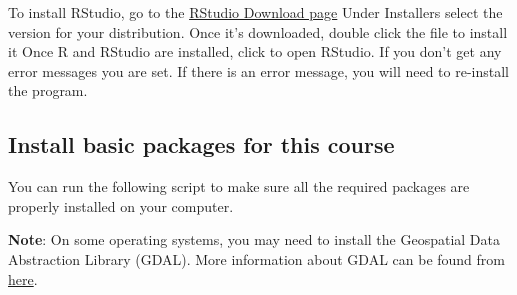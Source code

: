 \documentclass[]{book}
\newenvironment{Shaded}{\begin{snugshade}}{\end{snugshade}}
\newcommand{\CommentTok}[1]{\textcolor[rgb]{0.56,0.35,0.01}{\textit{#1}}}
\newcommand{\ControlFlowTok}[1]{\textcolor[rgb]{0.13,0.29,0.53}{\textbf{#1}}}
\newcommand{\DataTypeTok}[1]{\textcolor[rgb]{0.13,0.29,0.53}{#1}}
\newcommand{\KeywordTok}[1]{\textcolor[rgb]{0.13,0.29,0.53}{\textbf{#1}}}
\newcommand{\NormalTok}[1]{#1}
\newcommand{\OperatorTok}[1]{\textcolor[rgb]{0.81,0.36,0.00}{\textbf{#1}}}
\newcommand{\StringTok}[1]{\textcolor[rgb]{0.31,0.60,0.02}{#1}}
\begin{document}
To install RStudio, go to the \href{https://www.rstudio.com/products/rstudio/download/\#download}{RStudio Download page}
Under Installers select the version for your distribution.
Once it's downloaded, double click the file to install it
Once R and RStudio are installed, click to open RStudio. If you don't get any error messages you are set. If there is an error message, you will need to re-install the program.

\hypertarget{install-basic-packages-for-this-course}{%
\subsection{Install basic packages for this course}\label{install-basic-packages-for-this-course}}

You can run the following script to make sure all the required packages are properly installed on your computer.

\begin{Shaded}
\end{Shaded}

\textbf{Note}: On some operating systems, you may need to install the Geospatial Data Abstraction Library (GDAL). More information about GDAL can be found from \href{https://trac.osgeo.org/gdal/wiki/DownloadingGdalBinaries}{here}.
\end{document}
